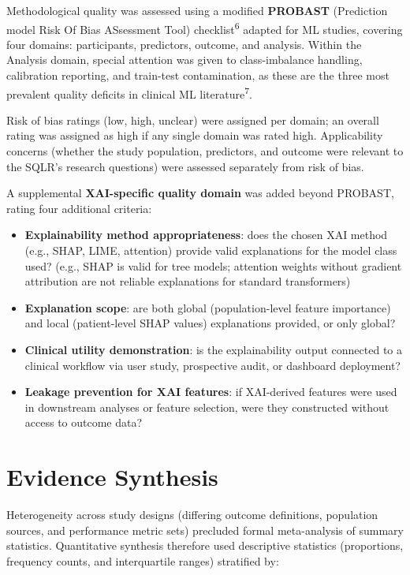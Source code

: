 \documentclass[
  12pt,
]{book}
\providecommand{\tightlist}{%
  \setlength{\itemsep}{0pt}\setlength{\parskip}{0pt}}
\begin{document}
Methodological quality was assessed using a modified \textbf{PROBAST}
(Prediction model Risk Of Bias ASsessment Tool)
checklist\textsuperscript{6} adapted for ML studies, covering four
domains: participants, predictors, outcome, and analysis. Within the
Analysis domain, special attention was given to class-imbalance
handling, calibration reporting, and train-test contamination, as these
are the three most prevalent quality deficits in clinical ML
literature\textsuperscript{7}.

Risk of bias ratings (low, high, unclear) were assigned per domain; an
overall rating was assigned as high if any single domain was rated high.
Applicability concerns (whether the study population, predictors, and
outcome were relevant to the SQLR's research questions) were assessed
separately from risk of bias.

A supplemental \textbf{XAI-specific quality domain} was added beyond
PROBAST, rating four additional criteria:

\begin{itemize}
\tightlist
\item
  \textbf{Explainability method appropriateness}: does the chosen XAI
  method (e.g., SHAP, LIME, attention) provide valid explanations for
  the model class used? (e.g., SHAP is valid for tree models; attention
  weights without gradient attribution are not reliable explanations for
  standard transformers)
\item
  \textbf{Explanation scope}: are both global (population-level feature
  importance) and local (patient-level SHAP values) explanations
  provided, or only global?
\item
  \textbf{Clinical utility demonstration}: is the explainability output
  connected to a clinical workflow via user study, prospective audit, or
  dashboard deployment?
\item
  \textbf{Leakage prevention for XAI features}: if XAI-derived features
  were used in downstream analyses or feature selection, were they
  constructed without access to outcome data?
\end{itemize}

\section{Evidence Synthesis}\label{evidence-synthesis}

Heterogeneity across study designs (differing outcome definitions,
population sources, and performance metric sets) precluded formal
meta-analysis of summary statistics. Quantitative synthesis therefore
used descriptive statistics (proportions, frequency counts, and
interquartile ranges) stratified by:
\end{document}
